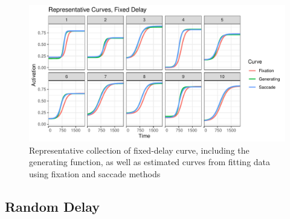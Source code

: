 \documentclass{article}
\begin{document}
\begin{figure}[h]
\centering
\includegraphics{fixed_pb_curves.pdf}
\caption{Representative collection of fixed-delay curve, including  the generating function, as well as estimated curves from fitting data using fixation and saccade methods}
\label{fig:fixed_pb_curves}
\end{figure}

\subsection{Random Delay}
\end{document}
